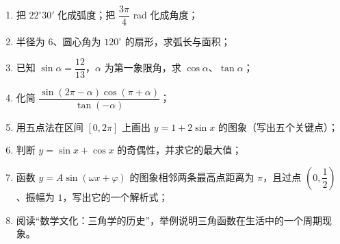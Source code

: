 \begin{afterclass}
\begin{enumerate}
  \item 把 $22^\circ30'$ 化成弧度；把 $\dfrac{3\pi}{4}$ rad 化成角度；
  \item 半径为 $6$、圆心角为 $120^\circ$ 的扇形，求弧长与面积；
  \item 已知 $\sin\alpha=\dfrac{12}{13}$，$\alpha$ 为第一象限角，求 $\cos\alpha$、$\tan\alpha$；
  \item 化简 $\dfrac{\sin(2\pi-\alpha)\cos(\pi+\alpha)}{\tan(-\alpha)}$；
  \item 用五点法在区间 $[0,2\pi]$ 上画出 $y=1+2\sin x$ 的图象（写出五个关键点）；
  \item 判断 $y=\sin x+\cos x$ 的奇偶性，并求它的最大值；
  \item 函数 $y=A\sin(\omega x+\varphi)$ 的图象相邻两条最高点距离为 $\pi$，且过点 $\left(0,\dfrac12\right)$、振幅为 $1$，写出它的一个解析式；
  \item 阅读“数学文化：三角学的历史”，举例说明三角函数在生活中的一个周期现象。
\end{enumerate}
\end{afterclass}
